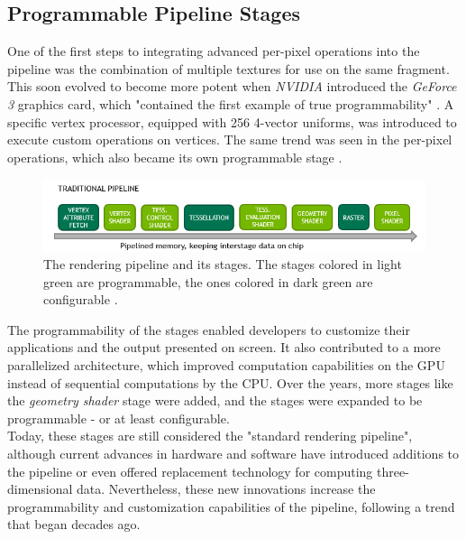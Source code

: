 \subsection*{Programmable Pipeline Stages}
 
One of the first steps to integrating advanced per-pixel operations into the pipeline was the combination of
multiple textures for use on the same fragment. This soon evolved to become more potent when \emph{NVIDIA} 
introduced the \emph{GeForce 3} graphics card, which "contained the first example of true programmability" 
\cite{KhronosProgramibility2024}. A specific vertex processor, equipped with 256 4-vector uniforms, was 
introduced to execute custom operations on vertices. The same trend was seen in the per-pixel operations, 
which also became its own programmable stage \cite{KhronosProgramibility2024}. \\

\clearpage

\begin{figure}[h]
    \centering
    \includegraphics[width=\linewidth]{images/graphics/traditional-rendering-pipeline.jpg}
    \caption{The rendering pipeline and its stages. The stages colored in light green are programmable, 
    the ones colored in dark green are configurable \cite{Kubisch2018}.}
    \label{fig:traditional-rendering-pipeline}
\end{figure}

\noindent
The programmability of the stages enabled developers to customize their applications and the output 
presented on screen. It also contributed to a more parallelized architecture, which improved computation 
capabilities on the \ac{GPU} instead of sequential computations by the \ac{CPU}. Over the years, more 
stages like the \emph{geometry shader} stage were added, and the stages were expanded to be programmable 
- or at least configurable. \\

\noindent
Today, these stages are still considered the "standard rendering pipeline", although current advances in 
hardware and software have introduced additions to the pipeline or even offered replacement technology 
for computing three-dimensional data. Nevertheless, these new innovations increase the programmability 
and customization capabilities of the pipeline, following a trend that began decades ago.


